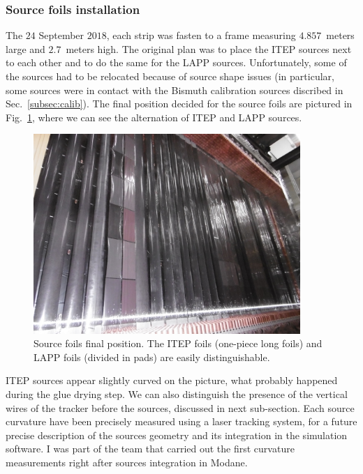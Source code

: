 \subsubsection*{Source foils installation}
The $24$ September $2018$, each strip was fasten to a frame measuring $4.857$~meters large and $2.7$~meters high.
The original plan was to place the ITEP sources next to each other and to do the same for the LAPP sources.
Unfortunately, some of the sources had to be relocated because of source shape issues (in particular, some sources were in contact with the Bismuth calibration sources discribed in Sec.~\ref{subsec:calib}).
The final position decided for the source foils are pictured in Fig.~\ref{fig:source_foils_installation}, where we can see the alternation of ITEP and LAPP sources.
\begin{figure}[h!]
\centering
\includegraphics[width=0.9\textwidth]{SNdemonstrator/fig_SNdemonstrator/sources_installed.jpg}
\caption{Source foils final position.
  The ITEP foils (one-piece long foils) and LAPP foils (divided in pads) are easily distinguishable.
  \label{fig:source_foils_installation}}
\end{figure}
ITEP sources appear slightly curved on the picture, what probably happened during the glue drying step.
We can also distinguish the presence of the vertical wires of the tracker before the sources, discussed in next sub-section.
Each source curvature have been precisely measured using a laser tracking system, for a future precise description of the sources geometry and its integration in the simulation software.
I was part of the team that carried out the first curvature measurements right after sources integration in Modane.


